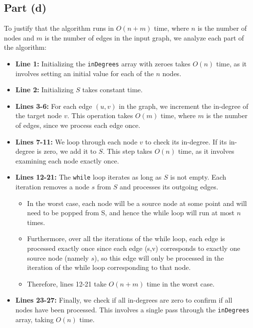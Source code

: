 \documentclass{article}
\begin{document}
\subsection*{Part (d)}

To justify that the algorithm runs in \( O(n + m) \) time, where \( n \) is the number of nodes and \( m \) is the number of edges in the input graph, we analyze each part of the algorithm:

\begin{itemize}
    \item \textbf{Line 1:} Initializing the \texttt{inDegrees} array with zeroes takes \( O(n) \) time, as it involves setting an initial value for each of the \( n \) nodes.

    \item \textbf{Line 2:} Initializing \( S \) takes constant time.
    
    \item \textbf{Lines 3-6:} For each edge \( (u, v) \) in the graph, we increment the in-degree of the target node \( v \). This operation takes \( O(m) \) time, where \( m \) is the number of edges, since we process each edge once.
    
    \item \textbf{Lines 7-11:} We loop through each node \( v \) to check its in-degree. If its in-degree is zero, we add it to \( S \). This step takes \( O(n) \) time, as it involves examining each node exactly once.
    
    \item \textbf{Lines 12-21:} The \texttt{while} loop iterates as long as \( S \) is not empty. Each iteration removes a node \( s \) from \( S \) and processes its outgoing edges.

    \begin{itemize}
        \item In the worst case, each node will be a source node at some point and will need to be popped from S, and hence the while loop will run at most \( n \) times. 
        \item Furthermore, over all the iterations of the while loop, each edge is processed exactly once since each edge (s,v) corresponds to exactly one source node (namely \( s \)), so this edge will only be processed in the iteration of the while loop corresponding to that node. 
        \item Therefore, lines 12-21 take \( O(n + m) \) time in the worst case.
    \end{itemize}
    
    \item \textbf{Lines 23-27:} Finally, we check if all in-degrees are zero to confirm if all nodes have been processed. This involves a single pass through the \texttt{inDegrees} array, taking \( O(n) \) time.
\end{itemize}
\end{document}
